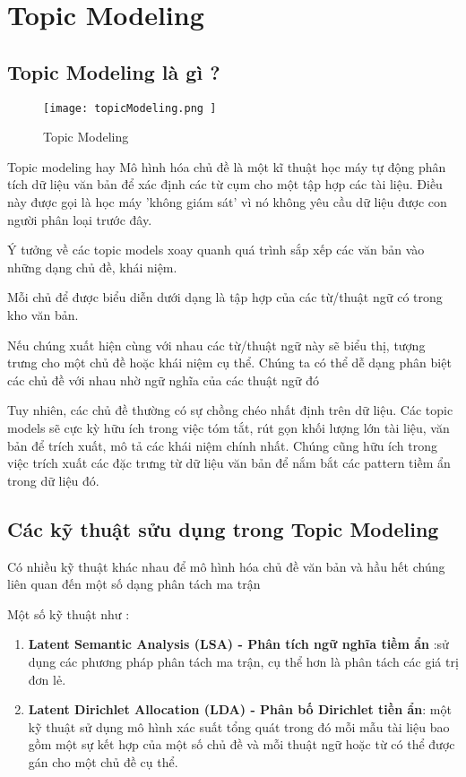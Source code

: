 \chapter{Topic Modeling}
\label{Chapter3}
\section{Topic Modeling là gì ?}
\begin{figure}[h!]
	\centering
	\texttt{[image: 
		topicModeling.png
	]}
	\caption[Topic Modeling]{
		Topic Modeling   \cite{WEBSITE:11}
	}
\end{figure}
Topic modeling hay Mô hình hóa chủ đề là một kĩ thuật học máy tự động phân tích dữ liệu văn bản để xác định các từ cụm cho một tập hợp các tài liệu. Điều này được gọi là học máy 'không giám sát' vì nó không yêu cầu dữ liệu  được con người phân loại trước đây.

Ý tưởng về các topic models xoay quanh quá trình sắp xếp các văn bản vào những dạng chủ đề, khái niệm. 

Mỗi chủ để được biểu diễn dưới dạng là tập hợp của các từ/thuật ngữ có trong kho văn bản.

Nếu chúng xuất hiện cùng với nhau các từ/thuật ngữ này sẽ biểu thị, tượng trưng cho một chủ đề hoặc khái niệm cụ thể. Chúng ta có thể dễ dạng phân biệt các chủ đề với nhau nhờ ngữ nghĩa của các thuật ngữ đó

Tuy nhiên, các chủ đề thường có sự chồng chéo nhất định trên dữ liệu. Các topic models sẽ cực kỳ hữu ích trong việc tóm tắt, rút gọn khối lượng lớn tài liệu, văn bản để trích xuất, mô tả các khái niệm chính nhất. Chúng cũng hữu ích trong việc trích xuất các đặc trưng từ dữ liệu văn bản để nắm bắt các pattern tiềm ẩn trong dữ liệu đó. \cite{WEBSITE:12}



\section{Các kỹ thuật sửu dụng trong Topic Modeling}

Có nhiều kỹ thuật khác nhau để mô hình hóa chủ đề văn bản và hầu hết chúng liên quan đến một số dạng phân tách ma trận

Một số kỹ thuật như \cite{WEBSITE:11}:

\begin{enumerate}
	\item \textbf{Latent Semantic Analysis  (LSA) - Phân tích ngữ nghĩa tiềm ẩn} :sử dụng các phương pháp phân tách ma trận, cụ thể hơn là phân tách các giá trị đơn lẻ.
	\item \textbf{Latent Dirichlet Allocation (LDA) - Phân bố Dirichlet tiền ẩn}: một kỹ thuật sử dụng mô hình xác suất tổng quát trong đó mỗi mẫu tài liệu bao gồm một sự kết hợp của một số chủ đề và mỗi thuật ngữ hoặc từ có thể được gán cho một chủ đề cụ thể.
\end{enumerate}

